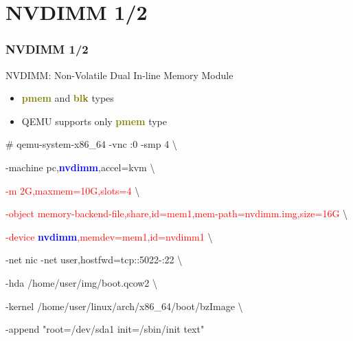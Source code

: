 \documentclass[aspectratio=169]{beamer}
\begin{document}
\section{NVDIMM 1/2}
\begin{frame}
\frametitle{NVDIMM 1/2}
{\LARGE NVDIMM: Non-Volatile Dual In-line Memory Module}
\begin{itemize}
\item {\large \textbf{\textcolor{olive}{pmem}} and \textbf{\textcolor{olive}{blk}} types}
\item {\large QEMU supports only \textbf{\textcolor{olive}{pmem}} type}
\end{itemize}
\begin{block}{}

\# qemu-system-x86\_64 -vnc :0 -smp 4 \textbackslash

-machine pc,\textbf{\textcolor{blue}{nvdimm}},accel=kvm \textbackslash

\textcolor{red}{-m 2G,maxmem=10G,slots=4} \textbackslash

\textcolor{red}{-object memory-backend-file,share,id=mem1,mem-path=nvdimm.img,size=16G} \textbackslash

\textcolor{red}{-device \textbf{\textcolor{blue}{nvdimm}},memdev=mem1,id=nvdimm1} \textbackslash

-net nic -net user,hostfwd=tcp::5022-:22 \textbackslash

-hda /home/user/img/boot.qcow2 \textbackslash

-kernel /home/user/linux/arch/x86\_64/boot/bzImage \textbackslash

-append "root=/dev/sda1 init=/sbin/init text"

\end{block}
\end{frame}

\end{document}
